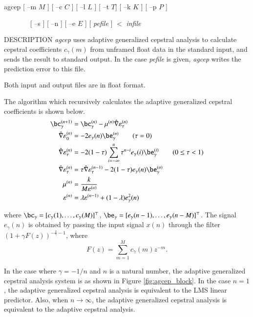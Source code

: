\begin{synopsis}
\item [agcep] [ --m $M$ ] [ --c $C$ ] [ --l $L$ ] [ --t $T$] [ --k $K$ ]
              [ --p $P$ ]
\item [\ ~~~~~~]  [ --s ] [ --n ] [ --e $E$ ] [ {\em pefile} ] $<$ {\em infile}
\end{synopsis}

\begin{qsection}{DESCRIPTION}
        {\em agcep} uses adaptive generalized cepstral analysis
        \cite{ref:agcep-IEICEtaikai90s}
        to calculate cepstral coefficients $c_\gamma(m)$ 
        from unframed float data in the standard input,
        and sends the result to standard output. 
        In the case {\em pefile} is given, 
        {\em agcep} writes the prediction error to this file.

        Both input and output files are in float format.

        The algorithm which recursively calculates the
        adaptive generalized cepstral coefficients is shown below.
\begin{align}
  \bc_\gamma^{(n+1)} &= \bc_\gamma^{(n)} 
     - \mu^{(n)} \hat{\nabla} \varepsilon_{\tau}^{(n)} \notag \\
  \hat{\nabla} \varepsilon_{0}^{(n)} &= -2 e_\gamma (n) \be_\gamma^{(n)}
  \qquad ( \tau = 0 ) \notag \\
  \hat{\nabla} \varepsilon_{\tau}^{(n)} &= -2 (1 - \tau) \sum_{i=-\infty}^{n}
  \tau^{n-i} e_\gamma (i) \be_\gamma^{(i)} \qquad ( 0 \le \tau < 1 ) \notag \\
  \hat{\nabla} \varepsilon_{\tau}^{(n)} &= \tau \hat{\nabla}  
  \varepsilon_{\tau}^{(n-1)} - 2 (1 - \tau) e_\gamma (n) \be_\gamma^{(n)}
  \notag \\
  \mu^{(n)} &= \frac{k}{M \varepsilon^{(n)}} \notag \\
  \varepsilon^{(n)} &= \lambda \varepsilon^{(n-1)}
     + (1-\lambda)e_\gamma^2(n) \notag
\end{align}     

where
$\bc_\gamma = [c_\gamma(1),\ldots,c_\gamma(M)]^\top$,
$\be_\gamma = [e_\gamma(n-1),\ldots,e_\gamma(n-M)]^\top$.
The signal $e_\gamma(n)$ is obtained by passing the input signal
 $x(n)$ through the filter $(1+\gamma F(z))^{-\frac{1}{\gamma}-1}$,
where 
\begin{displaymath}
F(z) = \sum_{m=1}^{M}c_\gamma(m)z^{-m}.
\end{displaymath}
\par
In the case where $\gamma = -1/n$ and $n$ is a natural number,
the adaptive generalized cepstral analysis system is as shown in
Figure \ref{fig:agcep_block}.
In the case $n=1$, the adaptive generalized cepstral
analysis is equivalent to the LMS linear predictor.
Also, when $n \rightarrow \infty$,
the adaptive generalized cepstral
analysis is equivalent to the 
adaptive cepstral analysis.


\end{qsection}
